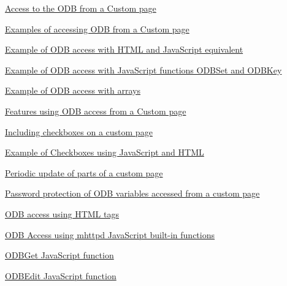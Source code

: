 \begin{TabularC}{2}
\begin{TabularC}{2}
\begin{DoxyItemize}
\begin{DoxyItemize}
\begin{DoxyItemize}
\begin{DoxyItemize}
\begin{DoxyItemize}
\item \hyperlink{RC_mhttpd_custom_ODB_access}{Access to the ODB from a Custom page} 
\begin{DoxyItemize}
\item \hyperlink{RC_mhttpd_custom_ODB_access_examples}{Examples of accessing ODB from a Custom page} 
\begin{DoxyItemize}
\item \hyperlink{RC_mhttpd_custom_ODB_access_examples_RC_mhttpd_js_example1}{Example of ODB access with HTML and JavaScript equivalent} 
\item \hyperlink{RC_mhttpd_custom_ODB_access_examples_RC_mhttpd_js_example2}{Example of ODB access with JavaScript functions ODBSet and ODBKey} 
\item \hyperlink{RC_mhttpd_custom_ODB_access_examples_RC_mhttpd_js_example3}{Example of ODB access with arrays} 
\end{DoxyItemize}
\item \hyperlink{RC_mhttpd_custom_ODB_access_features}{Features using ODB access from a Custom page} 
\begin{DoxyItemize}
\item \hyperlink{RC_mhttpd_custom_ODB_access_features_RC_mhttpd_custom_checkboxes}{Including checkboxes on a custom page} 
\item \hyperlink{RC_mhttpd_custom_ODB_access_features_RC_mhttpd_js_example_3}{Example of Checkboxes using JavaScript and HTML} 
\item \hyperlink{RC_mhttpd_custom_ODB_access_features_RC_mhttpd_js_update_part}{Periodic update of parts of a custom page} 
\item \hyperlink{RC_mhttpd_custom_ODB_access_features_RC_mhttpd_custom_pw_protection}{Password protection of ODB variables accessed from a custom page} 
\end{DoxyItemize}
\begin{DoxyItemize}
\item \hyperlink{RC_mhttpd_custom_ODB_access_RC_mhttpd_custom_odb_html}{ODB access using HTML tags} 
\item \hyperlink{RC_mhttpd_custom_ODB_access_RC_mhttpd_custom_odb_js}{ODB Access using mhttpd JavaScript built-\/in functions} 
\begin{DoxyItemize}
\item \hyperlink{RC_mhttpd_custom_ODB_access_RC_mhttpd_custom_odbget}{ODBGet JavaScript function} 
\item \hyperlink{RC_mhttpd_custom_ODB_access_RC_mhttpd_custom_odbedit}{ODBEdit JavaScript function} 

\end{DoxyItemize}
\end{DoxyItemize}
\end{DoxyItemize}
\end{DoxyItemize}
\end{DoxyItemize}
\end{DoxyItemize}
\end{DoxyItemize}
\end{DoxyItemize}
\end{TabularC}
\end{TabularC}
